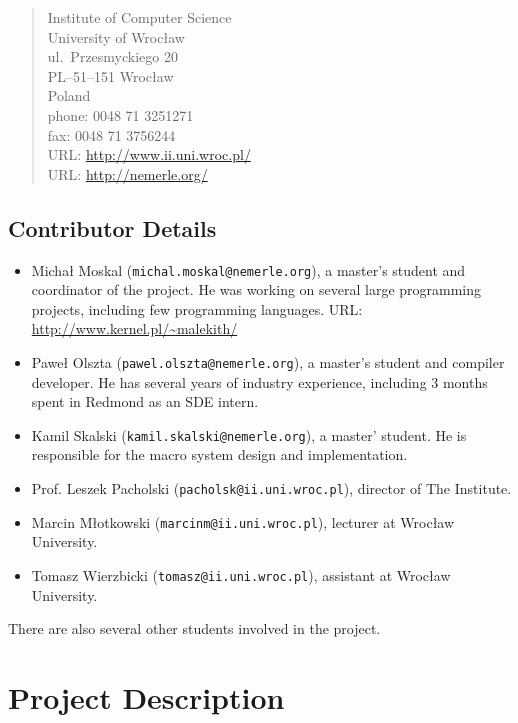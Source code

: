 \documentclass[a4paper,11pt]{article}
\begin{document}
\begin{quote}
Institute of Computer Science\\
University of Wroc\l aw\\
ul.\ Przesmyckiego 20\\
PL--51--151 Wroc\l aw\\
Poland\\[2ex]
phone: 0048 71 3251271\\
fax:   0048 71 3756244\\
URL: \url{http://www.ii.uni.wroc.pl/}\\
URL: \url{http://nemerle.org/}
\end{quote}


\subsection{Contributor Details}
\begin{itemize}

\item
Micha{\l} Moskal (\texttt{michal.moskal@nemerle.org}), a master's
student and coordinator of the project. He was working on several large
programming projects, including few programming languages. URL: 
\url{http://www.kernel.pl/~malekith/}

\item
Pawe{\l} Olszta (\texttt{pawel.olszta@nemerle.org}), a master's student
and compiler developer. He has several years of industry experience, 
including 3 months spent in Redmond as an SDE intern. 

\item
Kamil Skalski (\texttt{kamil.skalski@nemerle.org}), a master' student.
He is responsible for the macro system design and implementation.

\item
Prof. Leszek Pacholski (\texttt{pacholsk@ii.uni.wroc.pl}), director of The Institute.

\item
Marcin M\l otkowski (\texttt{marcinm@ii.uni.wroc.pl}), lecturer at Wroc\l aw University.

\item
Tomasz Wierzbicki (\texttt{tomasz@ii.uni.wroc.pl}), assistant at Wroc\l aw University.

\end{itemize}

There are also several other students involved in the project.


\section{Project Description}
\end{document}
